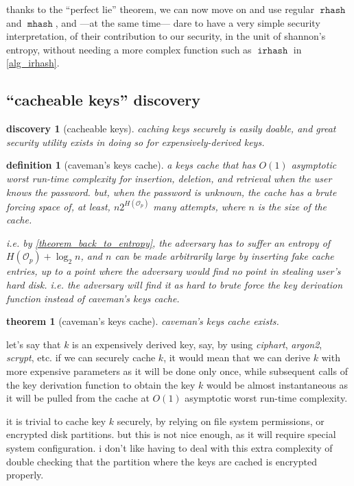 \documentclass[twocolumn]{article}
\newtheorem{definition}{definition}[section]
\newtheorem{theorem}{theorem}[section]
\newtheorem{discovery}{discovery}[section]
\DeclareMathOperator{\rhash}{\mathtt{rhash}}
\DeclareMathOperator{\mhash}{\mathtt{mhash}}
\DeclareMathOperator{\irhash}{\mathtt{irhash}}
\begin{document}
thanks to the ``perfect lie'' theorem, we can now move on and use regular
$\rhash$ and $\mhash$, and ---at the same time--- dare to have a very
simple security interpretation, of their contribution to our security, in
the unit of shannon's entropy, without needing a more complex function such
as $\irhash$ in \cref{alg_irhash}.

\subsection{``cacheable keys'' discovery}
\begin{discovery}[cacheable keys]\label{discov_key_caching}
    caching keys securely is easily doable, and great security utility
    exists in doing so for expensively-derived keys.
\end{discovery}
\begin{definition}[caveman's keys cache]
    a keys cache that has $O(1)$ asymptotic worst run-time complexity for
    insertion, deletion, and retrieval when the user knows the password.
    but, when the password is unknown, the cache has a brute forcing space
    of, at least, $n2^{H(\mathcal{O}_p)}$ many attempts, where $n$ is the
    size of the cache.

    i.e. by \cref{theorem_back_to_entropy}, the adversary has to suffer an
    entropy of $H(\mathcal{O}_p) + \log_2 n$, and $n$ can be made
    arbitrarily large by inserting fake cache entries, up to a point where
    the adversary would find no point in stealing user's hard disk.  i.e.
    the adversary will find it as hard to brute force the key derivation
    function instead of caveman's keys cache.
\end{definition}
\begin{theorem}[caveman's keys cache]
   caveman's keys cache exists.
\end{theorem}

let's say that $k$ is an expensively derived key, say, by using
\emph{ciphart}, \emph{argon2}, \emph{scrypt}, etc.  if we can securely
cache $k$, it would mean that we can derive $k$ with more expensive
parameters as it will be done only once, while subsequent calls of the key
derivation function to obtain the key $k$ would be almost instantaneous as
it will be pulled from the cache at $O(1)$ asymptotic worst run-time
complexity.

it is trivial to cache key $k$ securely, by relying on file system
permissions, or encrypted disk partitions.  but this is not nice enough, as
it will require special system configuration.  i don't like having to deal
with this extra complexity of double checking that the partition where the
keys are cached is encrypted properly.  
\end{document}
